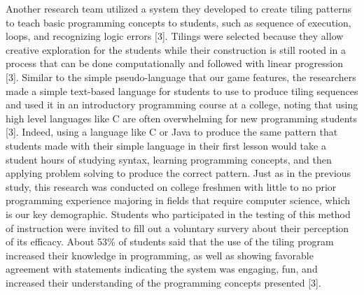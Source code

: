 Another research team utilized a system they developed to create tiling patterns to teach basic programming concepts to students, such as sequence of execution, loops, and recognizing logic errors [3]. Tilings were selected because they allow creative exploration for the students while their construction is still rooted in a process that can be done computationally and followed with linear progression [3]. Similar to the simple pseudo-language that our game features, the researchers made a simple text-based language for students to use to produce tiling sequences and used it in an introductory programming course at a college, noting that using high level languages like C are often overwhelming for new programming students [3]. Indeed, using a language like C or Java to produce the same pattern that students made with their simple language in their first lesson would take a student hours of studying syntax, learning programming concepts, and then applying problem solving to produce the correct pattern. Just as in the previous study, this research was conducted on college freshmen with little to no prior programming experience majoring in fields that require computer science, which is our key demographic. Students who participated in the testing of this method of instruction were invited to fill out a voluntary survery about their perception of its efficacy. About 53\% of students said that the use of the tiling program increased their knowledge in programming, as well as showing favorable agreement with statements indicating the system was engaging, fun, and increased their understanding of the programming concepts presented [3].\\

